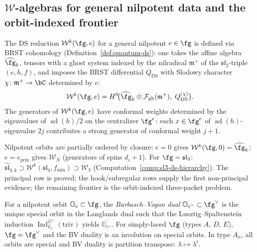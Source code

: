 \subsection{$\mathcal{W}$-algebras for general nilpotent data and the orbit-indexed frontier}
\label{sec:general-nilpotent-duality}

The DS reduction $\mathcal{W}^k(\fg, e)$ for a general nilpotent
$e \in \fg$ is defined via BRST cohomology
(Definition~\ref{def:quantum-ds}): one takes the affine algebra
$\widehat{\fg}_k$, tensors with a ghost system indexed by the nilradical
$\mathfrak{m}^+$ of the $\mathfrak{sl}_2$-triple $(e, h, f)$, and
imposes the BRST differential $Q_{\mathrm{DS}}$ with Slodowy character
$\chi \colon \mathfrak{m}^+ \to \bC$ determined by $e$:
\begin{equation}\label{eq:general-ds}
\mathcal{W}^k(\fg, e) = H^0\!\bigl(
\widehat{\fg}_k \otimes \mathcal{F}_{\mathrm{gh}}(\mathfrak{m}^+),\;
Q_{\mathrm{DS}}^{(\chi)}\bigr).
\end{equation}
The generators of $\mathcal{W}^k(\fg, e)$ have conformal weights
determined by the eigenvalues of $\operatorname{ad}(h)/2$ on the
centralizer $\fg^e$: each $x \in \fg^e$ of $\operatorname{ad}(h)$-eigenvalue
$2j$ contributes a strong generator of conformal weight $j + 1$.

\begin{remark}
\label{rem:ds-hierarchy-summary}
Nilpotent orbits are partially ordered by closure: $e = 0$ gives $\mathcal{W}^k(\fg, 0) = \widehat{\fg}_k$; $e = e_{\mathrm{prin}}$ gives $\mathcal{W}_N$ (generators of spins $d_i + 1$).  For $\fg = \mathfrak{sl}_3$: $\widehat{\mathfrak{sl}}_{3,k} \supset \mathcal{W}^k(\mathfrak{sl}_3, f_{\min}) \supset \mathcal{W}_3$ (Computation~\ref{comp:sl3-ds-hierarchy}).  The principal row is proved; the hook/subregular rows supply the first non-principal evidence; the remaining frontier is the orbit-indexed three-packet problem.
\end{remark}

\begin{definition}
\label{def:bv-dual}
For a nilpotent orbit $\mathbb{O}_e \subset \fg$, the
\emph{Barbasch--Vogan dual} $\mathbb{O}_{e^\vee} \subset \fg^\vee$ is
the unique special orbit in the Langlands dual such that
the Lusztig--Spaltenstein induction
$\operatorname{Ind}_{L_e}^{G^\vee}(\mathrm{triv})$ yields
$\overline{\mathbb{O}_{e^\vee}}$.  For simply-laced $\fg$
(types $A$, $D$, $E$), $\fg = \fg^\vee$ and the BV duality is an
involution on special orbits.  In type $A_n$, all orbits are special
and BV duality is partition transpose: $\lambda \mapsto \lambda^t$.
\end{definition}

